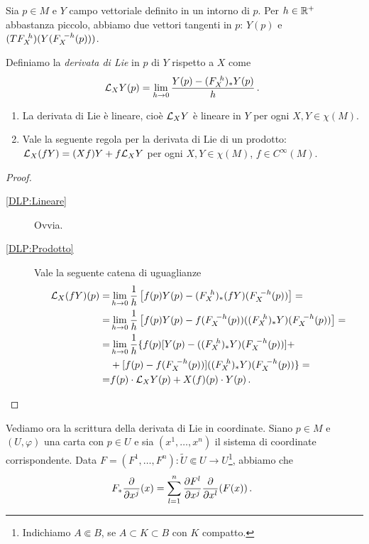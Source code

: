 Sia $p\in M$ e $Y$ campo vettoriale definito in un intorno di $p$. Per $h\in\mathbb R^+$ abbastanza piccolo, abbiamo due vettori tangenti in $p$: $Y(p)$ e $(TF_{X}^{\ h})(Y(F_{X}^{\ -h}(p)))$.

\begin{definition} 
	Definiamo la \emph{derivata di Lie} in $p$ di $Y$ rispetto a $X$ come \begin{equation*}\mathcal L_XY(p)=\lim_{h\to 0}\frac{Y(p)-(F_{X}^{\ h})_*Y(p)}h \, \text{. }
	\end{equation*}
\end{definition}

\begin{proposition} \label{prop:DerLieProprieta}
	\begin{enumerate}
		\item La derivata di Lie è lineare, cioè $\mathcal L_XY$ è lineare in $Y$ per ogni $X,Y\in\chi(M)$. \label{DLP:Lineare}
		\item Vale la seguente regola per la derivata di Lie di un prodotto: $\mathcal L_X(fY)=(Xf)Y+f\mathcal L_XY$ per ogni $X,Y\in\chi(M)$, $f\in C^\infty(M)$. \label{DLP:Prodotto}
	\end{enumerate}
\end{proposition}

\begin{proof}
	\begin{description}
	 \item [\ref{DLP:Lineare}] Ovvia.
	 \item [\ref{DLP:Prodotto}] Vale la seguente catena di uguaglianze
	 \begin{equation*} %
	 \begin{split}
	 \Lie_X(fY)(p)= & \lim_{h\to 0} \frac 1h \left[f(p)Y(p)-(\Fl{X}{h})_*(fY)(\Fl{X}{-h}(p))\right]=\\
	 = & \lim_{h\to 0}\frac 1h \left[f(p)Y(p)-f(\Fl{X}{-h}(p)) ((\Fl{X}{h})_*Y)(\Fl{X}{-h}(p))\right]=\\
	 = & \lim_{h\to 0}\frac 1h \{f(p)[Y(p)-((\Fl{X}{h})_*Y)(\Fl{X}{-h}(p))]+\\ &+[f(p)-f(\Fl{X}{-h}(p))]((\Fl{X}{h})_*Y)(\Fl{X}{-h}(p))\}=\\
	 = & f(p)\cdot\Lie_XY(p)+X(f)(p)\cdot Y(p) \punto
	 \end{split}
	 \end{equation*}
	 \end{description}
\end{proof}

Vediamo ora la scrittura della derivata di Lie in coordinate. Siano $p\in M$ e $(U,\varphi)$ una carta con $p\in U$ e sia $(x^1,\ldots,x^n)$ il sistema di coordinate corrispondente.
Data $F=(F^1,\ldots,F^n):\tilde U \Subset U \to U$\footnote{Indichiamo $A\Subset B$, se $A\subset K \subset B$ con $K$ compatto.}, abbiamo che \begin{equation*}
	F_*\frac\partial{\partial x^j}(x)=\sum_{l=1}^n \frac{\partial F^l}{\partial x^j}\frac\partial{\partial x^l}(F(x))\, \text{. }
\end{equation*}

